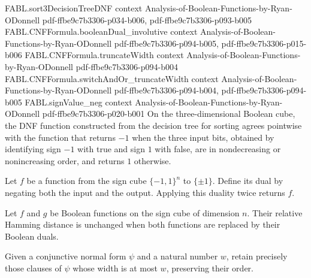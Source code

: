 \begin{theorem}
\proofstep
  {FABL.sort3DecisionTreeDNF}
  {context}
  {Analysis-of-Boolean-Functions-by-Ryan-ODonnell}
  {pdf-ffbe9c7b3306-p034-b006,
    pdf-ffbe9c7b3306-p093-b005}
\proofstep
  {FABL.CNFFormula.booleanDual_involutive}
  {context}
  {Analysis-of-Boolean-Functions-by-Ryan-ODonnell}
  {pdf-ffbe9c7b3306-p094-b005,
    pdf-ffbe9c7b3306-p015-b006}
\proofstep
  {FABL.CNFFormula.truncateWidth}
  {context}
  {Analysis-of-Boolean-Functions-by-Ryan-ODonnell}
  {pdf-ffbe9c7b3306-p094-b004}
\proofstep
  {FABL.CNFFormula.switchAndOr_truncateWidth}
  {context}
  {Analysis-of-Boolean-Functions-by-Ryan-ODonnell}
  {pdf-ffbe9c7b3306-p094-b004,
    pdf-ffbe9c7b3306-p094-b005}
\proofstep
  {FABL.signValue_neg}
  {context}
  {Analysis-of-Boolean-Functions-by-Ryan-ODonnell}
  {pdf-ffbe9c7b3306-p020-b001}
On the three-dimensional Boolean cube, the DNF function constructed from the decision
tree for sorting agrees pointwise with the function that returns $-1$ when the three
input bits, obtained by identifying sign $-1$ with true and sign $1$ with false, are in
nondecreasing or nonincreasing order, and returns $1$ otherwise.
\end{theorem}

\begin{theorem}
\label{FABL.CNFFormula.booleanDual_involutive}
\leanok
{}
Let $f$ be a function from the sign cube $\{-1,1\}^n$ to $\{\pm1\}$. Define its
dual by negating both the input and the output. Applying this duality twice returns $f$.
\end{theorem}

\begin{theorem}
\label{FABL.CNFFormula.relativeHammingDist_booleanDual}
\leanok
{}
Let $f$ and $g$ be Boolean functions on the sign cube of dimension $n$. Their relative
Hamming distance is unchanged when both functions are replaced by their Boolean duals.
\end{theorem}

\begin{definition}
\label{FABL.CNFFormula.truncateWidth}
\leanok
{}
Given a conjunctive normal form $\psi$ and a natural number $w$, retain precisely those
clauses of $\psi$ whose width is at most $w$, preserving their order.
\end{definition}

